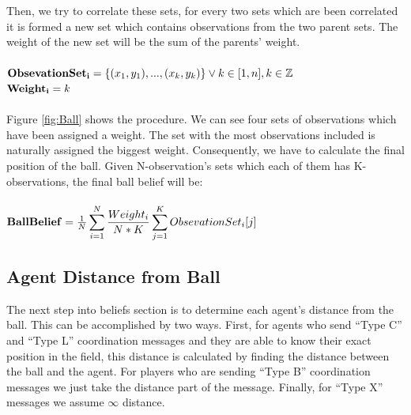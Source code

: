 Then, we try to correlate these sets, for every two sets which are been correlated it is formed a new set which contains observations from the two parent sets. The weight of the new set will be the sum of the parents' weight.\\
\\
${\bf Obsevation Set_{i} } = \lbrace (x_{1},y_{1}),...,(x_{k},y_{k}) \rbrace \vee k \in [1,n] , k\in \mathbb{Z}$\\
${\bf Weight_{i}} = k$\\
\\
Figure \ref{fig:Ball} shows the procedure. We can see four sets of observations which have been assigned a weight. The set with the most observations included is naturally assigned the biggest weight. Consequently, we have to calculate the final position of the ball.
Given N-observation's sets which each of them has K-observations, the final ball belief will be:\\
\\
${\bf Ball Belief} = \frac {1} {N} \displaystyle\sum\limits_{i=1}^N \frac {Weight_{i}} {N \ast K}  \displaystyle\sum\limits_{j=1}^K Obsevation Set_{i}[j]$
\subsection{Agent Distance from Ball}
The next step into beliefs section is to determine each agent's distance from the ball. This can be accomplished by two ways. First, for agents who send ``Type C'' and ``Type L'' coordination messages and they are able to know their exact position in the field, this distance is calculated by finding the distance between the ball and the agent. For players who are sending ``Type B'' coordination messages we just take the distance part of the message. Finally, for ``Type X'' messages we assume $\infty$ distance.

